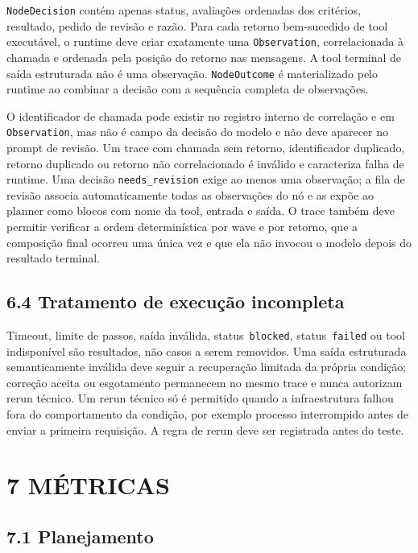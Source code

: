 \documentclass[12pt,a4paper]{article}
\begin{document}
\texttt{NodeDecision} contém apenas status, avaliações ordenadas dos critérios, resultado, pedido de revisão e razão. Para cada retorno bem-sucedido de tool executável, o runtime deve criar exatamente uma \texttt{Observation}, correlacionada à chamada e ordenada pela posição do retorno nas mensagens. A tool terminal de saída estruturada não é uma observação. \texttt{NodeOutcome} é materializado pelo runtime ao combinar a decisão com a sequência completa de observações.

O identificador de chamada pode existir no registro interno de correlação e em \texttt{Observation}, mas não é campo da decisão do modelo e não deve aparecer no prompt de revisão. Um trace com chamada sem retorno, identificador duplicado, retorno duplicado ou retorno não correlacionado é inválido e caracteriza falha de runtime. Uma decisão \texttt{needs\_revision} exige ao menos uma observação; a fila de revisão associa automaticamente todas as observações do nó e as expõe ao planner como blocos com nome da tool, entrada e saída. O trace também deve permitir verificar a ordem determinística por wave e por retorno, que a composição final ocorreu uma única vez e que ela não invocou o modelo depois do resultado terminal.


\subsection*{6.4 Tratamento de execução incompleta}

Timeout, limite de passos, saída inválida, status\texttt{ blocked}, status\texttt{ failed} ou tool indisponível são resultados, não casos a serem removidos. Uma saída estruturada semanticamente inválida deve seguir a recuperação limitada da própria condição; correção aceita ou esgotamento permanecem no mesmo trace e nunca autorizam rerun técnico. Um rerun técnico só é permitido quando a infraestrutura falhou fora do comportamento da condição, por exemplo processo interrompido antes de enviar a primeira requisição. A regra de rerun deve ser registrada antes do teste.



\section*{7 MÉTRICAS}

\subsection*{7.1 Planejamento}
\end{document}
